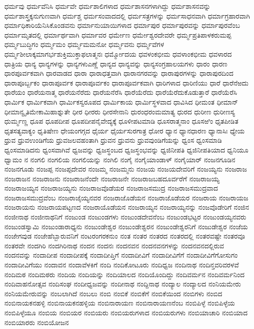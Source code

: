 {ಧರ್ಮವು
ಧರ್ಮವೆನಿಸಿ
ಧರ್ಮವೇ
ಧರ್ಮಶಾಲಿಗಳಾದ
ಧರ್ಮಶಾಸನಗಳಾಗಿದ್ದು
ಧರ್ಮಶಾಸನವನ್ನು
ಧರ್ಮಶಾಸ್ತ್ರಕ್ಕನುಗುಣವಾಗಿ
ಧರ್ಮಶ್ಚ
ಧರ್ಮಸಂವಾದದಲ್ಲಿ
ಧರ್ಮಸತ್ರಗಳನ್ನು
ಧರ್ಮಸಾಧನವಾಗಿ
ಧರ್ಮಾಗ್ರಹಾರವಾಗಿ
ಧರ್ಮಾಧಿಕಾರಿಯೆನಿಸಿಕೊಂಡವನು
ಧರ್ಮಾನುಯಾಯಿಗಳಾದ
ಧರ್ಮಾಪುರ
ಧರ್ಮಾಪುರವನ್ನು
ಧರ್ಮಾಪುರವೆಂಬ
ಧರ್ಮಾಮೃತದಲ್ಲಿ
ಧರ್ಮಾರ್ಥವಾಗಿ
ಧರ್ಮಾವರ
ಧರ್ಮೇಣ
ಧರ್ಮೇಶ್ವರದೇವರೇ
ಧರ್ಮ್ಮಪ್ರತಿಪಾಳಕರುಮಪ್ಪ
ಧರ್ಮ್ಮಬುದ್ಧಿಗಂ
ಧರ್ಮ್ಮಮಂ
ಧರ್ಮ್ಮಮಮನೋ
ಧರ್ಮ್ಮವನು
ಧರ್ಮ್ಮವೆಗಳ
ಧರ್ಮ್ಮಶೀಲಾಕ್ಕಮಾಗರ್ಭಶುಕ್ತಿಮುಕ್ತಾಫಲಾತ್ಮನಃ
ಧರ್ಮ್ಮೋದಯ
ಧವಳಂಕಭೀಮ
ಧವಳಾಂಕಭೀಮ
ಧವಳಾರದ
ಧಾತ್ರಿಯ
ಧಾನ್ಯ
ಧಾನ್ಯಗಳನ್ನು
ಧಾನ್ಯಗಳುಎಣ್ಣೆ
ಧಾನ್ಯದ
ಧಾನ್ಯವನ್ನು
ಧಾನ್ಯಸಂಗ್ರಹಾಲಯಗಳು
ಧಾರಂ
ಧಾರಣ
ಧಾರಪೂರ್ವಕವಾಗಿ
ಧಾರವಾಡದ
ಧಾರಾ
ಧಾರಾಧತ್ತವಾಗಿ
ಧಾರಾನಗರವನ್ನು
ಧಾರಾಪುರಗಳನ್ನು
ಧಾರಾಪುರದಿಂದ
ಧಾರಾಪೂರ್ಬ್ಬಕಂ
ಧಾರಾಪೂರ್ವಕ
ಧಾರಾಪೂರ್ವಕಂ
ಧಾರಾಪೂರ್ವಕವಾಗಿ
ಧಾರಿಗಳಾದ
ಧಾರಿಣಿಯು
ಧಾರೆ
ಧಾರೆನೆಱದು
ಧಾರೆಯಂ
ಧಾರೆಯನಾತ್ಮ
ಧಾರೆಯನೆರೆದು
ಧಾರೆಯನೆರೆಸಿ
ಧಾರೆಯೆರೆದು
ಧಾರೆಯೆರೆದುಕೊಡುತ್ತಾರೆ
ಧಾರೆಯೆರೆಸಿ
ಧಾರ್ಮಿಕ
ಧಾರ್ಮಿಕವಾಗಿ
ಧಾರ್ಮಿಕಸ್ವರೂಪದ
ಧಾರ್ಮಿಕಾಯ
ಧಾರ್ಮಿಸ್ಥಳವಾದ
ಧಾವಿಸಿದ
ಧೀಮಂತ
ಧೀಮಾನ್
ಧೀಮಾನ್ವೃತಿಮೇಕಾಮಿಹಾಶ್ನುತೇ
ಧೀರ
ಧೀರರು
ಧೀರಸೇನಾನಿ
ಧುರಂಧರಂಮಮಾತ್ಯ
ಧುರದ
ಧುರೀಣ
ಧುರೀಣಸ್ಯ
ಧುರ್ಮ್ಮಣ್ಣ
ಧೂಪ
ಧೂಪದೀಪ
ಧೂಪದೀಪನೈವೇದ್ಯಕ್ಕೆ
ಧೂಳೀಪಟಮಾಡಿ
ಧೂಸರಾತ್ಮನಾಂ
ಧೂಸಱಿಂ
ಧೃತಪೀಡಿತ
ಧೃತಸತ್ಯವಾಕ್ಯಂ
ಧೃತಿಷೇಣ
ಧೇಯಂಗಗ್ಗದ
ಧೈರ್ಯ
ಧೈರ್ಯಸುರಗಾತ್ರ
ಧೋರ
ಧ್ಯಾನ
ಧ್ಯಾನಧಾರಣ
ಧ್ಯಾನಾಸಿಃ
ಧ್ಯೇಯ
ಧ್ರುವ
ಧ್ರುವಉಂಡಿಗೆಯ
ಧ್ರುವಜಲವಹಂತಾಗಿ
ಧ್ರುವನ
ಧ್ರುವನು
ಧ್ರುವವುಂಡಿಗೆಯನ್ನು
ಧ್ವಂಸ
ಧ್ವಂಸಮಾಡಿ
ಧ್ವಂಸಮಾಡಿದನು
ಧ್ವಂಸವಾಗಿವೆ
ಧ್ವಜವನ್ನು
ಧ್ವಜಸ್ಥಂಬದ
ಧ್ವಜಸ್ಥಂಭವನ್ನು
ಧ್ವಜಿನೀಪತಿ
ಧ್ವಜಿನೀಪತಿಯಾದ
ಧ್ವನಿಯೂ
ಧ್ವಾಮಂ
ನ
ನಂಗಲಿ
ನಂಗಲಿಯ
ನಂಗಲಿಯನ್ನು
ನಂಗಿಲಿ
ನಂಗೈ
ನಂಗೈಯಾಂಡಾಳ್
ನಂಗೈಯಾರ್
ನಂಜನಗೂಡಿನ
ನಂಜನಗೂಡು
ನಂಜಪ್ಪ
ನಂಜಪ್ಪದೇವರ
ನಂಜಮ್ಮ
ನಂಜಮ್ಮನು
ನಂಜಯ
ನಂಜಯದೇವರಿಗೆ
ನಂಜಯ್ಯನು
ನಂಜರಾಜ
ನಂಜರಾಜನ
ನಂಜರಾಜನು
ನಂಜರಾಜನೆಂದೇ
ನಂಜರಾಜನೇ
ನಂಜರಾಜಬಹದೂರ್ವರೆಗೆ
ನಂಜರಾಜಯ್ಯ
ನಂಜರಾಜಯ್ಯನ
ನಂಜರಾಜಯ್ಯನು
ನಂಜರಾಜವೊಡೆಯರ
ನಂಜರಾಜಸಮುದ್ರ
ನಂಜರಾಜಸಮುದ್ರವಾದ
ನಂಜರಾಜಸಮುದ್ರವೆಂಬ
ನಂಜರಾಜೈಯ್ಯನವರ
ನಂಜರಾಜೊಡೆಯನ
ನಂಜರಾಜೊಡೆಯರ
ನಂಜರಾಯ
ನಂಜರಾಯಜ
ನಂಜರಾಯನು
ನಂಜರಾಯಪಟ್ಟಣದ
ನಂಜರಾಯೊಡೆಯನ
ನಂಜರಾಯ್ಯನ
ನಂಜರಾಯ್ಯನನ್ನು
ನಂಜವೊಡೇರಿಗೆ
ನಂಜಿನ
ನಂಜೀನಾಥ
ನಂಜೀನಾಥನಿಗೆ
ನಂಜುಂಡ
ನಂಜುಂಡಗಳು
ನಂಜುಂಡದೇವನೆಂಬ
ನಂಜುಂಡಭಟ್ಟರ
ನಂಜುಂಡಯ್ಯನವರು
ನಂಜುಂಡಸ್ವಾಮಿ
ನಂಜುಂಡಾರಾಧ್ಯನು
ನಂಜುಂಡೇಶ್ವರ
ನಂಜುಂಡೇಶ್ವರನ
ನಂಜುಂಡೇಶ್ವರನಿಗೆ
ನಂಜುಡೇಶ್ವರ
ನಂಜೆಯ
ನಂಜೇಗವುಡ
ನಂಜೇಹೆಬ್ಬಾರುವನಿಗೆ
ನಂಟರಂಗರಕನುಂ
ನಂತ
ನಂತರ
ನಂತರದ
ನಂತರದಲ್ಲಿ
ನಂತರವಷ್ಟೇ
ನಂತರವೂ
ನಂತರವೇ
ನಂದಗಿರಿ
ನಂದಗಿರಿನಾಥ
ನಂದನ
ನಂದನಃ
ನಂದನವನ
ನಂದನವನಗಳನ್ನು
ನಂದನವನದಲ್ಲಿರುವ
ನಂದನವನ್ನು
ನಂದಾದೀಪ
ನಂದಾದೀಪಕ್ಕೆ
ನಂದಾದೀಪ್ತಿಗೆ
ನಂದಾದೀವಿಗೆ
ನಂದಾದೀವಿಗೆಗೆ
ನಂದಾದೀವಿಗೆಗೋಸುಗಂ
ನಂದಾದೀವಿಗೆಯು
ನಂದಾವನ
ನಂದಾವೆಳಕಿಗೆ
ನಂದಿ
ನಂದಿಕೋಟೂರು
ನಂದಿಧ್ವಜ
ನಂದಿನಾಥ
ನಂದಿನ್ತವರಿವರಳವೆ
ನಂದಿಮಠ
ನಂದಿಮಠರು
ನಂದಿಯ
ನಂದಿಯನ್ನು
ನಂದಿಯಾಲದ
ನಂದಿಯೊಂದಿದ್ದು
ನಂದಿವರ್ಮನ
ನಂದಿವರ್ಮನಿಂದ
ನಂದಿವಾಹನೋತ್ಸವ
ನಂದಿಸಂಘ
ನಂದೀಧ್ವಜವನ್ನು
ನಂದೀನಾಥ
ನಂದ್ದಿನಾಥ
ನಂದ್ಯಾಲ
ನಂದ್ಯಾಲದ
ನಂನಿಯಮೇರು
ನಂನಿಯಮೇರುವನ್ನು
ನಂಬಲಾಗಿದೆ
ನಂಬಲು
ನಂಬಿ
ನಂಬಿಕೆ
ನಂಬಿಕೆಗೆ
ನಂಬಿಕೆಯಿಂದ
ನಂಬಿಗಳು
ನಂಬಿದ
ನಂಬಿನಾಯಕನಹಳ್ಳಿ
ನಂಬಿನಾಯಕನಹಳ್ಳಿಯ
ನಂಬಿನಾರಾಯಣ
ನಂಬಿನಾರಾಯಣನೆಂಬ
ನಂಬಿಪಿಳ್ಳೆ
ನಂಬಿಪಿಳ್ಳೆಯ
ನಂಬಿಪಿಳ್ಳೆಯೂ
ನಂಬಿಯ
ನಂಬಿಯರ
ನಂಬಿಯರು
ನಂಬಿಯರುಗಳಾದ
ನಂಬಿಯರುಗಳು
ನಂಬಿಯಾಚಾರಿ
ನಂಬಿಯಾದ
ನಂಬಿಯಾರರು
ನಂಬಿಯೋಜನ
}
